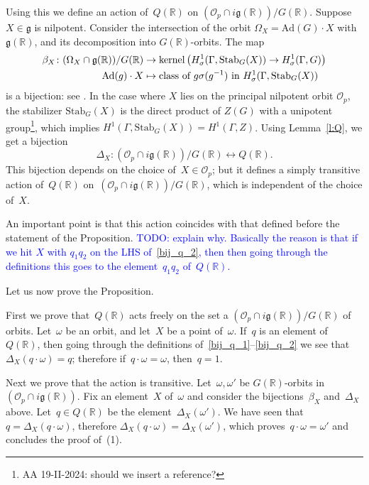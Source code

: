 \documentclass[10pt,leqno]{article}
\newcommand{\kernel}{\mathrm{kernel}}
\renewcommand{\O}{\mathcal O}
\newcommand{\R}{\mathbb R}
\newcommand{\g}{\mathfrak g}
\newcommand{\Op}{\O_p}
\begin{document}
Using this we define an action of~$Q(\R)$ on $(\Op \cap i\g(\R))/G(\R)$. Suppose~$X \in \g$ is nilpotent. Consider the intersection of the orbit $\Omega_X=\mathrm{Ad}(G) \cdot X$ with $\g(\R)$, and its decomposition into $G(\R)$-orbits. The map 
\begin{align} \label{bij_q_2}\beta_X\colon (\Omega_{X} \cap \g(\R))/G(\R) & \to \kernel\left(H^1_\sigma(\Gamma,\mathrm{Stab}_G(X))\rightarrow H^1_\sigma(\Gamma,G)\right) \\ \mathrm{Ad}(g) \cdot X & \mapsto \text{class of $ g\sigma(g^{-1})$ in $H^1_\sigma(\Gamma,\mathrm{Stab}_G(X))$} \nonumber \end{align} 
is a bijection: see \cite[Lemma 5.2]{galois}. 
In the case where $X$ lies on the principal nilpotent orbit $\Op$, the stabilizer $\mathrm{Stab}_G(X)$ is the direct product of $Z(G)$ with a unipotent group\footnote{AA 19-II-2024: should we insert a reference?}, which implies $H^1(\Gamma, \mathrm{Stab}_G(X)) =H^1(\Gamma,Z)$. Using Lemma~\ref{l:Q}, we get a bijection 
\[\Delta_X\colon (\Op \cap i\g(\R))/G(\R) \leftrightarrow Q(\R).\]
This bijection depends  on the choice of~$X \in \Op$; but it defines a simply transitive action of~$Q(\R)$ on~$(\Op \cap i\g(\R))/G(\R)$, which is independent of the choice of~$X$. 

An important point is that this action coincides with that defined before the statement of the Proposition. \textcolor{blue}{TODO: explain why. Basically the reason is that if we hit $X$ with $q_1q_2$ on the LHS of~\eqref{bij_q_2}, then then going through the definitions this goes to the element~$q_1q_2$ of~$Q(\R)$.}

Let us now prove the Proposition. 

First we prove that~$Q(\R)$ acts freely on the set a  $(\Op \cap i\g(\R))/G(\R)$ of orbits. Let~$\omega$ be an orbit, and let~$X$ be a point of~$\omega$. If~$q$ is an element of~$Q(\R)$, then going through the definitions of~\eqref{bij_q_1}--\eqref{bij_q_2} we see that~$\Delta_X(q \cdot \omega) = q$; therefore if~$q\cdot \omega=\omega$, then~$q=1$.

Next we prove that the action is transitive. Let~$\omega, \omega'$ be $G(\R)$-orbits in  $(\Op \cap i\g(\R))$. Fix an element~$X$ of~$\omega$ and consider the bijections~$\beta_X$ and~$\Delta_X$ above. Let~$q \in Q(\R)$ be the element~$\Delta_X(\omega')$. We have seen that $q = \Delta_X(q \cdot \omega)$, therefore \mbox{$\Delta_X(q \cdot \omega)=\Delta_X(\omega')$}, which proves~$q \cdot \omega = \omega'$ and concludes the proof of~(1). 
\end{document}

